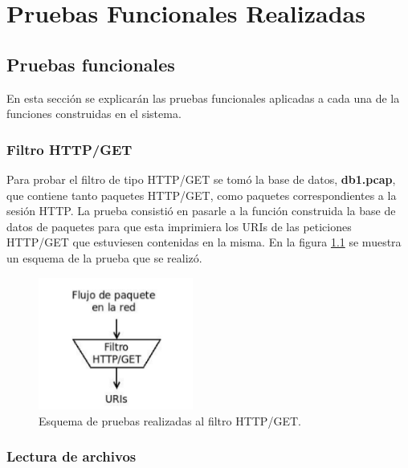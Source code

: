 \chapter{Pruebas Funcionales Realizadas}
\label{apendiceB}

\section*{Pruebas funcionales}

En esta sección se explicarán las pruebas funcionales aplicadas a cada
una de la funciones construidas en el sistema.

\subsection*{Filtro HTTP/GET}

Para probar el filtro de tipo HTTP/GET se tomó la base de datos,
\textbf{db1.pcap}, que contiene tanto paquetes HTTP/GET, como paquetes correspondientes a la sesión HTTP. La prueba consistió en pasarle a la función construida la base de datos de paquetes para que esta imprimiera los URIs de las peticiones HTTP/GET que estuviesen contenidas en la misma. En la
figura \ref{fig:filtroHTTP} se muestra un esquema de la prueba que se realizó.

\begin{figure}[!htb]
\begin{center}
\includegraphics[width=2in]{./img/filtroHTTP.png}
\caption{Esquema de pruebas realizadas al filtro HTTP/GET.}
\label{fig:filtroHTTP}
\end{center}
\end{figure}

\subsection*{Lectura de archivos}

